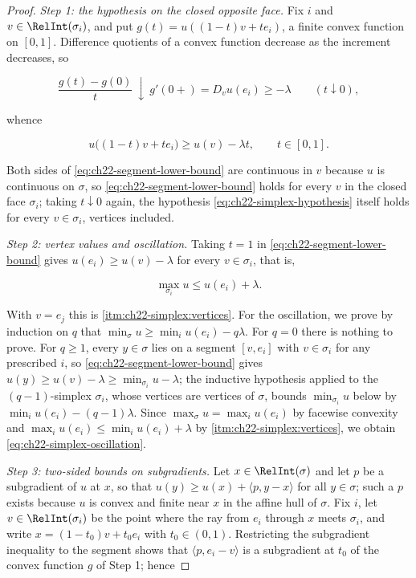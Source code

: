 \begin{proof}
\emph{Step 1: the hypothesis on the closed opposite face.}
Fix \(i\) and \(v\in\RelInt(\sigma_i)\), and put
\(g(t)=u((1-t)v+te_i)\), a finite convex function on \([0,1]\).  Difference
quotients of a convex function decrease as the increment decreases, so

\[
 \frac{g(t)-g(0)}{t}\ \downarrow\ g'(0+)=D_vu(e_i)\geq-\lambda
 \qquad(t\downarrow0),
\]

whence

\[
 u\bigl((1-t)v+te_i\bigr)\geq u(v)-\lambda t,
 \qquad t\in[0,1].
\tag{22.13}\label{eq:ch22-segment-lower-bound}
\]

Both sides of \eqref{eq:ch22-segment-lower-bound} are continuous in \(v\)
because \(u\) is continuous on \(\sigma\), so
\eqref{eq:ch22-segment-lower-bound} holds for every \(v\) in the closed face
\(\sigma_i\); taking \(t\downarrow0\) again, the hypothesis
\eqref{eq:ch22-simplex-hypothesis} itself holds for every
\(v\in\sigma_i\), vertices included.

\emph{Step 2: vertex values and oscillation.}  Taking \(t=1\) in
\eqref{eq:ch22-segment-lower-bound} gives
\(u(e_i)\geq u(v)-\lambda\) for every \(v\in\sigma_i\), that is,

\[
 \max_{\sigma_i}u\leq u(e_i)+\lambda .
\tag{22.14}\label{eq:ch22-facet-max-bound}
\]

With \(v=e_j\) this is
\cref{itm:ch22-simplex:vertices}.  For the oscillation, we prove by
induction on \(q\) that
\(\min_\sigma u\geq\min_iu(e_i)-q\lambda\).  For \(q=0\) there is nothing to
prove.  For \(q\geq1\), every \(y\in\sigma\) lies on a segment
\([v,e_i]\) with \(v\in\sigma_i\) for any prescribed \(i\), so
\eqref{eq:ch22-segment-lower-bound} gives
\(u(y)\geq u(v)-\lambda\geq\min_{\sigma_i}u-\lambda\); the inductive
hypothesis applied to the \((q-1)\)-simplex \(\sigma_i\), whose vertices are
vertices of \(\sigma\), bounds \(\min_{\sigma_i}u\) below by
\(\min_iu(e_i)-(q-1)\lambda\).  Since
\(\max_\sigma u=\max_iu(e_i)\) by facewise convexity and
\(\max_iu(e_i)\leq\min_iu(e_i)+\lambda\) by
\cref{itm:ch22-simplex:vertices}, we obtain
\eqref{eq:ch22-simplex-oscillation}.

\emph{Step 3: two-sided bounds on subgradients.}  Let
\(x\in\RelInt(\sigma)\) and let \(p\) be a subgradient of \(u\) at \(x\),
so that \(u(y)\geq u(x)+\langle p,y-x\rangle\) for all \(y\in\sigma\); such
a \(p\) exists because \(u\) is convex and finite near \(x\) in the affine
hull of \(\sigma\).  Fix \(i\), let \(v\in\RelInt(\sigma_i)\) be the point
where the ray from \(e_i\) through \(x\) meets \(\sigma_i\), and write
\(x=(1-t_0)v+t_0e_i\) with \(t_0\in(0,1)\).  Restricting the subgradient
inequality to the segment shows that \(\langle p,e_i-v\rangle\) is a
subgradient at \(t_0\) of the convex function \(g\) of Step 1; hence


\end{proof}
